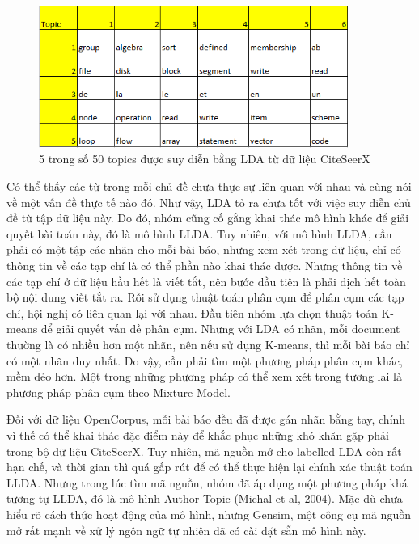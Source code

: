 \documentclass[12pt,a4paper]{article}
\begin{document}
\begin{figure}[h]
    \centering
    \captionsetup{justification=centering}
    \includegraphics[width=0.9\textwidth]{topicsLDA}
    \caption{5 trong số 50 topics được suy diễn bằng LDA từ dữ liệu CiteSeerX}
    \label{fig:topicsLDA}
\end{figure}

\noindent
Có thể thấy các từ trong mỗi chủ đề chưa thực sự liên quan với nhau và cùng nói về một vấn đề thực tế nào đó. Như vậy, LDA tỏ ra chưa tốt với việc suy diễn chủ đề từ tập dữ liệu này. Do đó, nhóm cũng cố gắng khai thác mô hình khác để giải quyết bài toán này, đó là mô hình LLDA. Tuy nhiên, với mô hình LLDA, cần phải có một tập các nhãn cho mỗi bài báo, nhưng xem xét trong dữ liệu, chỉ có thông tin về các tạp chí là có thể phần nào khai thác được. Nhưng thông tin về các tạp chí ở dữ liệu hầu hết là viết tắt, nên bước đầu tiên là phải dịch hết toàn bộ nội dung viết tắt ra. Rồi sử dụng thuật toán phân cụm để phân cụm các tạp chí, hội nghị có liên quan lại với nhau. Đầu tiên nhóm lựa chọn thuật toán K-means để giải quyết vấn đề phân cụm. Nhưng với LDA có nhãn, mỗi document thường là có nhiều hơn một nhãn, nên nếu sử dụng K-means, thì mỗi bài báo chỉ có một nhãn duy nhất. Do vậy, cần phải tìm một phương pháp phân cụm khác, mềm dẻo hơn. Một trong những phương pháp có thể xem xét trong tương lai là phương pháp phân cụm theo Mixture Model.


Đối với dữ liệu OpenCorpus, mỗi bài báo đều đã được gán nhãn bằng tay, chính vì thế có thể khai thác đặc điểm này để khắc phục những khó khăn gặp phải trong bộ dữ liệu CiteSeerX. Tuy nhiên, mã nguồn mở cho labelled LDA còn rất hạn chế, và thời gian thì quá gấp rút để có thể thực hiện lại chính xác thuật toán LLDA. Nhưng trong lúc tìm mã nguồn, nhóm đã áp dụng một phương pháp khá tương tự LLDA, đó là mô hình Author-Topic (Michal et al, 2004). Mặc dù chưa hiểu rõ cách thức hoạt động của mô hình, nhưng Gensim, một công cụ mã nguồn mở rất mạnh về xử lý ngôn ngữ tự nhiên đã có cài đặt sẵn mô hình này. 
\end{document}
